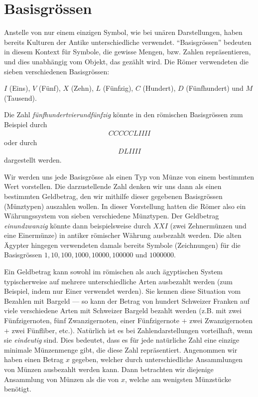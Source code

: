\section{Basisgrössen}\label{section:Basisgroessen}
Anstelle von nur einem einzigen Symbol, wie bei unären Darstellungen, haben bereits Kulturen der Antike unterschiedliche
 verwendet. \enquote{Basisgrössen} bedeuten in diesem Kontext für Symbole, die gewisse Mengen, bzw. Zahlen repräsentieren, und dies unabhängig vom Objekt, das gezählt wird. Die Römer verwendeten die sieben verschiedenen Basisgrössen:
\begin{center}
	$I$ (Eins), $V$ (Fünf), $X$ (Zehn), $L$ (Fünfzig), $C$ (Hundert), $D$ (Fünfhundert) und $M$ (Tausend).
\end{center}
\begin{myexample}\label{myexample:roman}
Die Zahl \textit{fünfhundertvierundfünfzig} könnte in den römischen Basisgrössen zum Beispiel durch
\begin{align*}
	CCCCCLIIII
\end{align*}
oder durch
\begin{align*}
	DLIIII
\end{align*}
dargestellt werden.
\end{myexample}
Wir werden uns jede Basisgrösse als einen Typ von Münze von einem bestimmten Wert vorstellen. Die darzustellende Zahl
denken wir uns dann als einen bestimmten Geldbetrag, den wir mithilfe dieser gegebenen Basisgrössen (Münztypen) auszahlen wollen. In
dieser Vorstellung hatten die Römer also ein Währungssystem von sieben verschiedene Münztypen. Der Geldbetrag \textit{einundzwanzig} könnte
dann beispielsweise durch $XXI$ (zwei Zehnermünzen und eine Einermünze) in antiker römischer Währung ausbezahlt werden. Die alten Ägypter hingegen verwendeten damals bereits Symbole (Zeichnungen) für die Basisgrössen $1, 10, 100, 1000, 10000,
	100000$ und $1000000$.

Ein Geldbetrag kann sowohl im römischen als auch ägyptischen System typischerweise auf mehrere unterschiedliche Arten
ausbezahlt werden (zum Beispiel, indem nur Einer verwendet werden). Sie kennen diese Situation vom Bezahlen mit
Bargeld --- so kann der Betrag von hundert Schweizer Franken auf viele verschiedene Arten mit Schweizer Bargeld bezahlt werden
(z.B. mit zwei Fünfzigernoten, fünf Zwanzigernoten, einer Fünfzigernote $+$ zwei Zwanzigernoten $+$ zwei Fünfliber, etc.). Natürlich ist
es bei Zahlendarstellungen vorteilhaft, wenn sie \textit{eindeutig} sind. Dies bedeutet, dass es für jede natürliche Zahl eine einzige minimale Münzenmenge gibt, die diese Zahl repräsentiert. Angenommen wir haben einen Betrag $x$ gegeben, welcher durch
unterschiedliche Ansammlungen von Münzen ausbezahlt werden kann. Dann betrachten wir diejenige Ansammlung von Münzen als
die  von $x$, welche am wenigsten Münzstücke benötigt.

